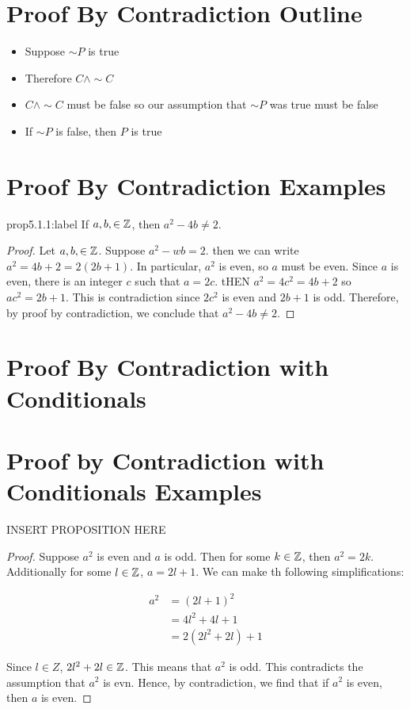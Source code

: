 \section{Proof By Contradiction Outline}

\begin{itemize}
    \item Suppose $\sim P$ is true
    \item Therefore $C \wedge \sim C$
    \item $C \wedge \sim C$ must be false so our assumption that $\sim P$ was true must be false
    \item If $\sim P$ is false, then $P$ is true
\end{itemize}


\section{Proof By Contradiction Examples}

\begin{proposition}{prop5.1.1:label}
    If $a,b,\in\mathbb{Z}$, then $a^2-4b\ne 2$.
\end{proposition}

\begin{proof}
    Let $a,b,\in\mathbb{Z}$. Suppose $a^2-wb = 2$. then we can write $a^2 = 4b+2=2(2b+1)$. In particular, $a^2$ is even, so $a$ must be even. Since $a$ is even, there is an integer $c$ such that $a=2c$. tHEN $a^2 = 4c^2 = 4b+2$ so $ac^2 = 2b+1$. This is  contradiction since $2c^2$ is even and $2b+1$ is odd. Therefore, by proof by contradiction, we conclude that $a^2-4b \ne 2$.
\end{proof}


\section{Proof By Contradiction with Conditionals}




\section{Proof by Contradiction with Conditionals Examples}

\begin{proposition}
    INSERT PROPOSITION HERE
\end{proposition}

\begin{proof}
    Suppose $a^2$ is even and $a$ is odd. Then for some $k \in \mathbb{Z}$, then $a^2 = 2k$. Additionally for some $l \in \mathbb{Z}$, $a = 2l + 1$. We can make th following simplifications:

    $$
    \begin{aligned}
        a^2 &= (2l + 1)^2\\
        &= 4l^2 + 4l + 1\\
        &= 2(2l^2 + 2l) + 1
    \end{aligned}
    $$

    Since $l \in Z$, $2l^2 + 2l \in \mathbb{Z}$. This means that $a^2$ is odd. This contradicts the assumption that $a^2$ is evn. Hence, by contradiction, we find that if $a^2$ is even, then $a$ is even.
\end{proof}

